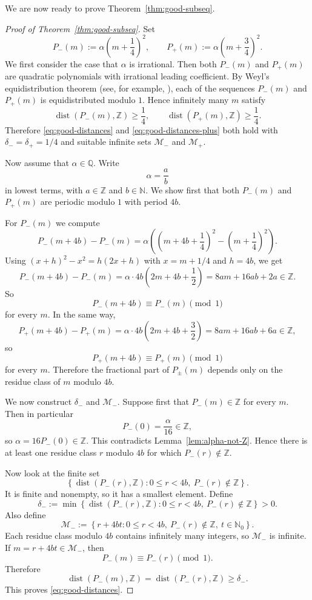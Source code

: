 \documentclass[reqno]{amsart}
\theoremstyle{definition}
\theoremstyle{plain}
\theoremstyle{remark}
\numberwithin{equation}{section}
\newcommand{\Z}{\mathbb{Z}}
\newcommand{\N}{\mathbb{N}}
\newcommand{\dist}{\operatorname{dist}}
\begin{document}
We are now ready to prove Theorem~\ref{thm:good-subseq}.

\begin{proof}[Proof of Theorem~\ref{thm:good-subseq}]
Set
\[
  P_-(m):=\alpha\left(m+\frac14\right)^2,
  \qquad
  P_+(m):=\alpha\left(m+\frac34\right)^2.
\]
We first consider the case that $\alpha$ is irrational. Then both $P_-(m)$ and $P_+(m)$ are quadratic polynomials with irrational leading coefficient. By Weyl's equidistribution theorem (see, for example, \cite[Chapter~1]{KuipersNiederreiter}), each of the sequences $P_-(m)$ and $P_+(m)$ is equidistributed modulo $1$. Hence infinitely many $m$ satisfy
\[
  \dist(P_-(m),\Z)\ge \frac14,
  \qquad
  \dist(P_+(m),\Z)\ge \frac14.
\]
Therefore \eqref{eq:good-distances} and \eqref{eq:good-distances-plus} both hold with $\delta_-=\delta_+=1/4$ and suitable infinite sets $\mathcal M_-$ and $\mathcal M_+$.

Now assume that $\alpha\in \mathbb{Q}$. Write
\[
  \alpha=\frac{a}{b}
\]
in lowest terms, with $a\in \Z$ and $b\in \N$. We show first that both $P_-(m)$ and $P_+(m)$ are periodic modulo $1$ with period $4b$.

For $P_-(m)$ we compute
\[
  P_-(m+4b)-P_-(m)
  =\alpha\left(\left(m+4b+\frac14\right)^2-\left(m+\frac14\right)^2\right).
\]
Using $(x+h)^2-x^2=h(2x+h)$ with $x=m+1/4$ and $h=4b$, we get
\[
  P_-(m+4b)-P_-(m)
  =\alpha\cdot 4b\left(2m+4b+\frac12\right)
  =8am+16ab+2a\in \Z.
\]
So
\[
  P_-(m+4b)\equiv P_-(m)\pmod 1
\]
for every $m$. In the same way,
\[
  P_+(m+4b)-P_+(m)
  =\alpha\cdot 4b\left(2m+4b+\frac32\right)
  =8am+16ab+6a\in \Z,
\]
so
\[
  P_+(m+4b)\equiv P_+(m)\pmod 1
\]
for every $m$. Therefore the fractional part of $P_{\pm}(m)$ depends only on the residue class of $m$ modulo $4b$.

We now construct $\delta_-$ and $\mathcal M_-$. Suppose first that $P_-(m)\in \Z$ for every $m$. Then in particular
\[
  P_-(0)=\frac{\alpha}{16}\in \Z,
\]
so $\alpha=16P_-(0)\in \Z$. This contradicts Lemma~\ref{lem:alpha-not-Z}. Hence there is at least one residue class $r$ modulo $4b$ for which $P_-(r)\notin \Z$.

Now look at the finite set
\[
  \left\{\dist(P_-(r),\Z):0\le r<4b,\ P_-(r)\notin \Z\right\}.
\]
It is finite and nonempty, so it has a smallest element. Define
\[
  \delta_-:=\min\left\{\dist(P_-(r),\Z):0\le r<4b,\ P_-(r)\notin \Z\right\}>0.
\]
Also define
\[
  \mathcal M_-:=\left\{r+4bt:0\le r<4b,\ P_-(r)\notin \Z,\ t\in \N_0\right\}.
\]
Each residue class modulo $4b$ contains infinitely many integers, so $\mathcal M_-$ is infinite. If $m=r+4bt\in \mathcal M_-$, then
\[
  P_-(m)\equiv P_-(r)\pmod 1.
\]
Therefore
\[
  \dist(P_-(m),\Z)=\dist(P_-(r),\Z)\ge \delta_-.
\]
This proves \eqref{eq:good-distances}.


\end{proof}
\end{document}

